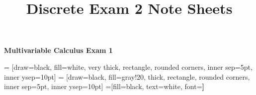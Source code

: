 \documentclass{article}
\title{Discrete Exam 2 Note Sheets}
\begin{document}
\begin{center}{\huge{\textbf{Multivariable Calculus Exam 1}}}\\
\end{center}
\begin{multicols*}{2}

     = [draw=black, fill=white, very thick,
    rectangle, rounded corners, inner sep=5pt, inner ysep=10pt]
     = [draw=black, fill=gray!20, thick,
    rectangle, rounded corners, inner sep=5pt, inner ysep=10pt]
     =[fill=black, text=white, font=\bfseries]

\end{multicols*}
\end{document}
